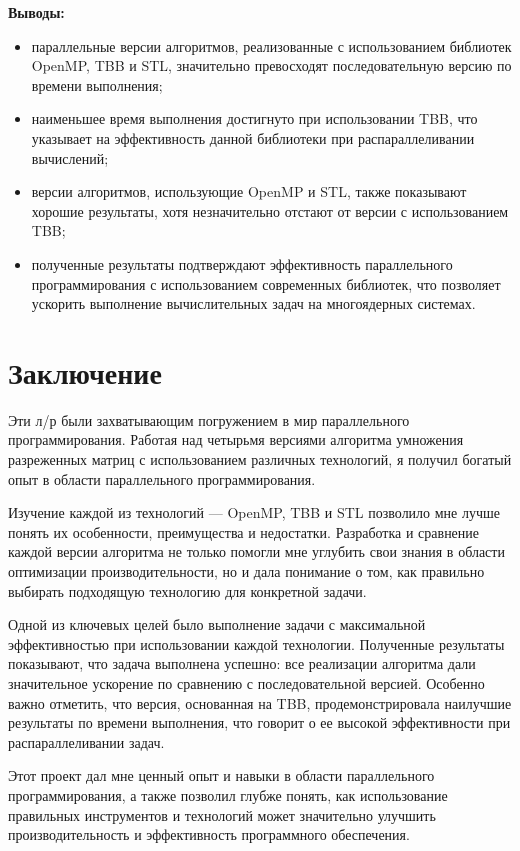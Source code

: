 \documentclass[a4paper, 14pt]{article}
\begin{document}
	\textbf{Выводы:}
	\vspace{-1em}
	\begin{itemize}[leftmargin=3em]
		\setlength\itemsep{0cm}
		\item параллельные версии алгоритмов, реализованные с использованием библиотек OpenMP, TBB и STL, значительно превосходят последовательную версию по времени выполнения;
		\item наименьшее время выполнения достигнуто при использовании TBB, что указывает на эффективность данной библиотеки при распараллеливании вычислений;
		\item версии алгоритмов, использующие OpenMP и STL, также показывают хорошие результаты, хотя незначительно отстают от версии с использованием TBB;
		\item полученные результаты подтверждают эффективность параллельного программирования с использованием современных библиотек, что позволяет ускорить выполнение вычислительных задач на многоядерных системах.
	\end{itemize}
	
	\newpage
	\section*{\centering Заключение}
	
	Эти л/р были захватывающим погружением в мир параллельного программирования. Работая над четырьмя версиями алгоритма умножения разреженных матриц с использованием различных технологий, я получил богатый опыт в области параллельного программирования.
	
	Изучение каждой из технологий --- OpenMP, TBB и STL позволило мне лучше понять их особенности, преимущества и недостатки. Разработка и сравнение каждой версии алгоритма не только помогли мне углубить свои знания в области оптимизации производительности, но и дала понимание о том, как правильно выбирать подходящую технологию для конкретной задачи.
	
	Одной из ключевых целей было выполнение задачи с максимальной эффективностью при использовании каждой технологии. Полученные результаты показывают, что задача выполнена успешно: все реализации алгоритма дали значительное ускорение по сравнению с последовательной версией. Особенно важно отметить, что версия, основанная на TBB, продемонстрировала наилучшие результаты по времени выполнения, что говорит о ее высокой эффективности при распараллеливании задач.
	
	Этот проект дал мне ценный опыт и навыки в области параллельного программирования, а также позволил глубже понять, как использование правильных инструментов и технологий может значительно улучшить производительность и эффективность программного обеспечения.
	
\end{document}
